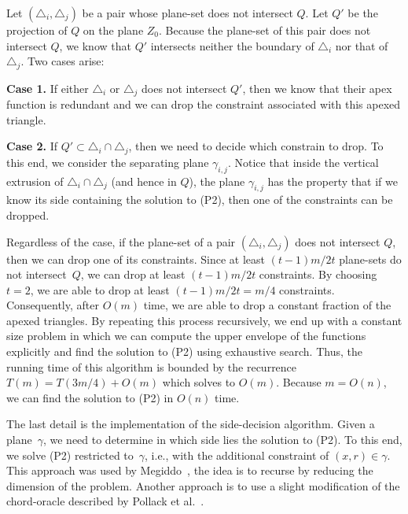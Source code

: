 \documentclass[a4paper]{article}
\begin{document}
Let $(\triangle_i, \triangle_j)$ be a pair whose plane-set does not intersect $Q$. 
Let $Q'$ be the projection of $Q$ on the plane $Z_0$. Because the plane-set of this pair does not intersect $Q$, we know that $Q'$ intersects neither the boundary of $\triangle_i$ nor that of $\triangle_j$.
Two cases arise:

\textbf{Case 1.} If either $\triangle_i$ or $\triangle_j$ does not intersect $Q'$, then we know that their apex function is redundant and we can drop the constraint associated with this apexed triangle.

\textbf{Case 2.} If $Q'\subset \triangle_i\cap \triangle_j$, then we need to decide which constrain to drop. 
To this end, we consider the separating plane $\gamma_{i,j}$. Notice that inside the vertical extrusion of $\triangle_i\cap \triangle_j$ (and hence in $Q$), the plane $\gamma_{i,j}$ has the property that if we know its side containing the solution to (P2), then one of the constraints can be dropped. %
\vspace{.05in}

Regardless of the case, if the plane-set of a pair $(\triangle_i, \triangle_j)$ does not intersect $Q$, then we can drop one of its constraints. 
Since at least $(t-1)m/2t$ plane-sets do not intersect~$Q$, we can drop at least $(t-1)m/2t$ constraints.
By choosing $t = 2$, we are able to drop at least $(t-1)m/2t = m/4$ constraints.
Consequently, after $O(m)$ time, we are able to drop a constant fraction of the apexed triangles.
By repeating this process recursively, we end up with a constant size problem in which we can compute the upper envelope of the functions explicitly and find the solution to (P2) using exhaustive search. 
Thus, the running time of this algorithm is bounded by the recurrence $T(m) = T(3m/4) + O(m)$ which solves to $O(m)$. 
Because $m = O(n)$, we can find the solution to (P2) in $O(n)$ time.

The last detail is the implementation of the side-decision algorithm. 
Given a plane~$\gamma$, we need to determine in which side lies the solution to (P2).
To this end, we solve (P2) restricted to~$\gamma$, i.e., with the additional constraint of $(x,r)\in \gamma$. 
This approach was used by Megiddo~\cite{megiddo1989ball}, the idea is to recurse by reducing the dimension of the problem.
Another approach is to use a slight modification of the chord-oracle described by Pollack et al.~\cite[Section~3]{pollackComputingCenter}. 
\end{document}
